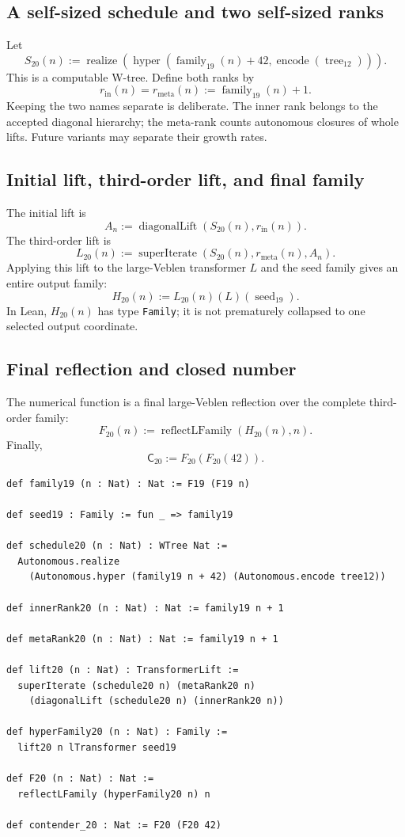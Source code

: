 \documentclass[11pt]{article}
\theoremstyle{definition}
\theoremstyle{remark}
\newcommand{\leanname}[1]{\nolinkurl{#1}}
\newcommand{\Ctwenty}{\mathsf{C}_{20}}
\begin{document}
\subsection{A self-sized schedule and two self-sized ranks}

Let
\[
  S_{20}(n)
  :=\operatorname{realize}\!
     \left(\operatorname{hyper}
       (\operatorname{family}_{19}(n)+42,
        \operatorname{encode}(\operatorname{tree}_{12}))\right).
\]
This is a computable W-tree.  Define both ranks by
\[
  r_{\mathrm{in}}(n)=r_{\mathrm{meta}}(n)
  :=\operatorname{family}_{19}(n)+1.
\]
Keeping the two names separate is deliberate.  The inner rank belongs to the
accepted diagonal hierarchy; the meta-rank counts autonomous closures of whole
lifts.  Future variants may separate their growth rates.

\subsection{Initial lift, third-order lift, and final family}

The initial lift is
\[
  A_n:=\operatorname{diagonalLift}(S_{20}(n),r_{\mathrm{in}}(n)).
\]
The third-order lift is
\[
  L_{20}(n):=
  \operatorname{superIterate}
    (S_{20}(n),r_{\mathrm{meta}}(n),A_n).
\]
Applying this lift to the large-Veblen transformer $L$ and the seed family gives
an entire output family:
\[
  H_{20}(n):=L_{20}(n)(L)(\operatorname{seed}_{19}).
\]
In Lean, $H_{20}(n)$ has type \leanname{Family}; it is not prematurely
collapsed to one selected output coordinate.

\subsection{Final reflection and closed number}

The numerical function is a final large-Veblen reflection over the complete
third-order family:
\[
  F_{20}(n):=\operatorname{reflectLFamily}(H_{20}(n),n).
\]
Finally,
\[
  \boxed{\Ctwenty:=F_{20}(F_{20}(42)).}
\]

\begin{lstlisting}[caption={The complete numerical definition.}]
def family19 (n : Nat) : Nat := F19 (F19 n)

def seed19 : Family := fun _ => family19

def schedule20 (n : Nat) : WTree Nat :=
  Autonomous.realize
    (Autonomous.hyper (family19 n + 42) (Autonomous.encode tree12))

def innerRank20 (n : Nat) : Nat := family19 n + 1

def metaRank20 (n : Nat) : Nat := family19 n + 1

def lift20 (n : Nat) : TransformerLift :=
  superIterate (schedule20 n) (metaRank20 n)
    (diagonalLift (schedule20 n) (innerRank20 n))

def hyperFamily20 (n : Nat) : Family :=
  lift20 n lTransformer seed19

def F20 (n : Nat) : Nat :=
  reflectLFamily (hyperFamily20 n) n

def contender_20 : Nat := F20 (F20 42)
\end{lstlisting}
\end{document}
